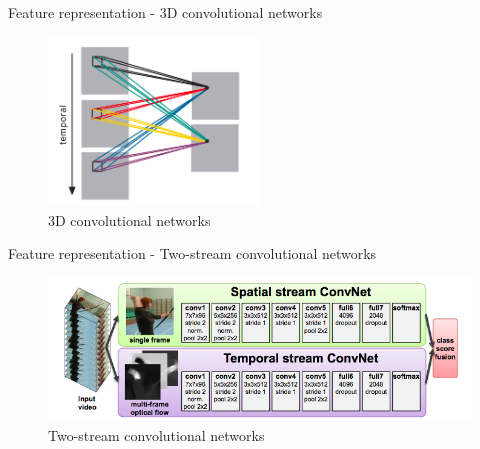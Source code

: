 \begin{frame}{Feature representation - 3D convolutional networks}
    \begin{figure}[htp]
        \centering
        \includegraphics[width=0.5\textwidth]{topics/201010-zhang2019comprehensive/assets/img/3d-cnn.png}
        \caption{3D convolutional networks}
    \end{figure}
\end{frame}

\begin{frame}{Feature representation - Two-stream convolutional networks}
    \begin{figure}[htp]
        \centering
        \includegraphics[width=\textwidth]{topics/201010-zhang2019comprehensive/assets/img/2-stream-cnn.png}
        \caption{Two-stream convolutional networks}
    \end{figure}
\end{frame}

